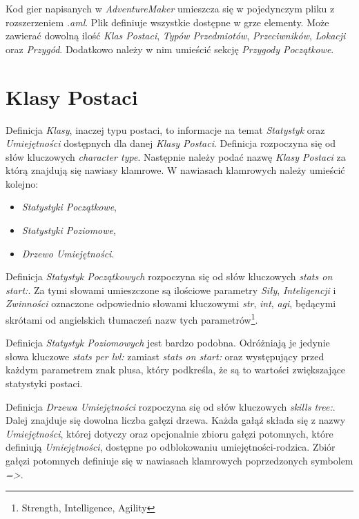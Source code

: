 \documentclass[openright]{xmgr}
\begin{document}
Kod gier napisanych w \textit{AdventureMaker} umieszcza się w pojedynczym pliku z rozszerzeniem \textit{.aml}. Plik definiuje wszystkie dostępne w grze elementy. Może zawierać dowolną ilość \textit{Klas Postaci}, \textit{Typów Przedmiotów}, \textit{Przeciwników}, \textit{Lokacji} oraz \textit{Przygód}. Dodatkowo należy w nim umieścić sekcję \textit{Przygody Początkowe}. 

\section{Klasy Postaci}
Definicja \textit{Klasy}, inaczej typu postaci, to informacje na temat \textit{Statystyk} oraz \textit{Umiejętności} dostępnych dla danej \textit{Klasy Postaci}. Definicja rozpoczyna się od słów kluczowych \textit{character type}. Następnie należy podać nazwę \textit{Klasy Postaci} za którą znajdują się nawiasy klamrowe. W nawiasach klamrowych należy umieścić kolejno:
\begin{itemize}
	\item \textit{Statystyki Początkowe},
	\item \textit{Statystyki Poziomowe},
	\item \textit{Drzewo Umiejętności}.
\end{itemize}

Definicja \textit{Statystyk Początkowych} rozpoczyna się od słów kluczowych \textit{stats on start:}. Za tymi słowami umieszczone są ilościowe parametry \textit{Siły}, \textit{Inteligencji} i \textit{Zwinności} oznaczone odpowiednio słowami kluczowymi \textit{str}, \textit{int}, \textit{agi}, będącymi skrótami od angielskich tłumaczeń nazw tych parametrów\footnote{Strength, Intelligence, Agility}.

Definicja \textit{Statystyk Poziomowych} jest bardzo podobna. Odróżniają je jedynie słowa kluczowe \textit{stats per lvl:} zamiast  \textit{stats on start:} oraz występujący przed każdym parametrem znak plusa, który podkreśla, że są to wartości zwiększające statystyki postaci. 

Definicja \textit{Drzewa Umiejętności} rozpoczyna się od słów kluczowych \textit{skills tree:}. Dalej znajduje się dowolna liczba gałęzi drzewa.
Każda gałąź składa się z nazwy \textit{Umiejętności}, której dotyczy oraz opcjonalnie zbioru gałęzi potomnych, które definiują \textit{Umiejętności}, dostępne po odblokowaniu umiejętności-rodzica.
Zbiór gałęzi potomnych definiuje się w nawiasach klamrowych poprzedzonych symbolem \textit{=>}. 
\end{document}
